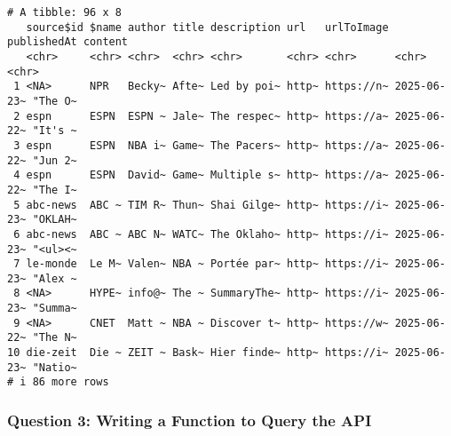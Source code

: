 \documentclass[
  letterpaper,
  DIV=11,
  numbers=noendperiod]{scrartcl}
\newenvironment{Shaded}{\begin{snugshade}}{\end{snugshade}}
\newcommand{\CommentTok}[1]{\textcolor[rgb]{0.37,0.37,0.37}{#1}}
\newcommand{\ControlFlowTok}[1]{\textcolor[rgb]{0.00,0.23,0.31}{\textbf{#1}}}
\newcommand{\FunctionTok}[1]{\textcolor[rgb]{0.28,0.35,0.67}{#1}}
\newcommand{\NormalTok}[1]{\textcolor[rgb]{0.00,0.23,0.31}{#1}}
\newcommand{\OtherTok}[1]{\textcolor[rgb]{0.00,0.23,0.31}{#1}}
\newcommand{\SpecialCharTok}[1]{\textcolor[rgb]{0.37,0.37,0.37}{#1}}
\newcommand{\StringTok}[1]{\textcolor[rgb]{0.13,0.47,0.30}{#1}}
\begin{document}
\begin{verbatim}
# A tibble: 96 x 8
   source$id $name author title description url   urlToImage publishedAt content
   <chr>     <chr> <chr>  <chr> <chr>       <chr> <chr>      <chr>       <chr>  
 1 <NA>      NPR   Becky~ Afte~ Led by poi~ http~ https://n~ 2025-06-23~ "The O~
 2 espn      ESPN  ESPN ~ Jale~ The respec~ http~ https://a~ 2025-06-22~ "It's ~
 3 espn      ESPN  NBA i~ Game~ The Pacers~ http~ https://a~ 2025-06-22~ "Jun 2~
 4 espn      ESPN  David~ Game~ Multiple s~ http~ https://a~ 2025-06-22~ "The I~
 5 abc-news  ABC ~ TIM R~ Thun~ Shai Gilge~ http~ https://i~ 2025-06-23~ "OKLAH~
 6 abc-news  ABC ~ ABC N~ WATC~ The Oklaho~ http~ https://i~ 2025-06-23~ "<ul><~
 7 le-monde  Le M~ Valen~ NBA ~ Portée par~ http~ https://i~ 2025-06-23~ "Alex ~
 8 <NA>      HYPE~ info@~ The ~ SummaryThe~ http~ https://i~ 2025-06-23~ "Summa~
 9 <NA>      CNET  Matt ~ NBA ~ Discover t~ http~ https://w~ 2025-06-22~ "The N~
10 die-zeit  Die ~ ZEIT ~ Bask~ Hier finde~ http~ https://i~ 2025-06-23~ "Natio~
# i 86 more rows
\end{verbatim}

\subsubsection{Question 3: Writing a Function to Query the
API}\label{question-3-writing-a-function-to-query-the-api}

\begin{Shaded}
\end{Shaded}
\end{document}
